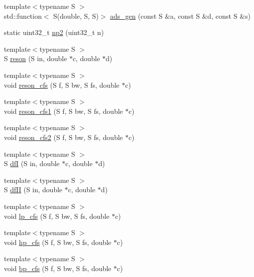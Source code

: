 \begin{DoxyCompactItemize}
\item 
{\footnotesize template$<$typename S $>$ }\\std\+::function$<$ S(double, S, S)$>$ \hyperlink{namespace_aurora_a966a076f1768216bd9c2d6a07aebf034}{ads\+\_\+gen} (const S \&a, const S \&d, const S \&s)
\item 
static uint32\+\_\+t \hyperlink{namespace_aurora_a49b6f6d92479d80271ced42627154066}{np2} (uint32\+\_\+t n)
\item 
{\footnotesize template$<$typename S $>$ }\\S \hyperlink{namespace_aurora_a5f8647080e611bbb89c4778a9e02e063}{reson} (S in, double $\ast$c, double $\ast$d)
\item 
{\footnotesize template$<$typename S $>$ }\\void \hyperlink{namespace_aurora_a6001679ef5f80dcee8eaa5d90b1f9448}{reson\+\_\+cfs} (S f, S bw, S fs, double $\ast$c)
\item 
{\footnotesize template$<$typename S $>$ }\\void \hyperlink{namespace_aurora_a6a9aa81047a6c7c24bbd6d36077f6726}{reson\+\_\+cfs1} (S f, S bw, S fs, double $\ast$c)
\item 
{\footnotesize template$<$typename S $>$ }\\void \hyperlink{namespace_aurora_a797ddf91c14611eaea1c55f901f40cbf}{reson\+\_\+cfs2} (S f, S bw, S fs, double $\ast$c)
\item 
{\footnotesize template$<$typename S $>$ }\\S \hyperlink{namespace_aurora_ac8ec71dca2761ba7e67669e84faf11dc}{dfI} (S in, double $\ast$c, double $\ast$d)
\item 
{\footnotesize template$<$typename S $>$ }\\S \hyperlink{namespace_aurora_aa413f561e3e6eba365c8268bb6403262}{df\+II} (S in, double $\ast$c, double $\ast$d)
\item 
{\footnotesize template$<$typename S $>$ }\\void \hyperlink{namespace_aurora_af00fa05fba77610297abc0dcb14f2770}{lp\+\_\+cfs} (S f, S bw, S fs, double $\ast$c)
\item 
{\footnotesize template$<$typename S $>$ }\\void \hyperlink{namespace_aurora_a51c342d920dfc9f5d5538ff79f47b0e3}{hp\+\_\+cfs} (S f, S bw, S fs, double $\ast$c)
\item 
{\footnotesize template$<$typename S $>$ }\\void \hyperlink{namespace_aurora_a1d13ad5ed3c1a6494f338436762b67bc}{bp\+\_\+cfs} (S f, S bw, S fs, double $\ast$c)

\end{DoxyCompactItemize}
